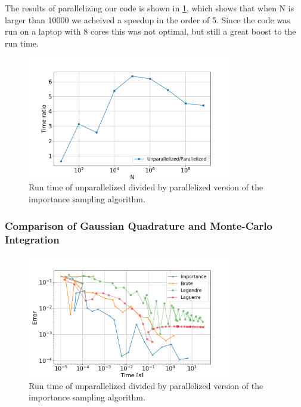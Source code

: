 The results of parallelizing our code is shown in \cref{fig:mc_time_ratio}, which
shows that when N is larger than 10000 we acheived a speedup in the order of 5.
Since the code was run on a laptop with 8 cores this was not optimal, but still
a great boost to the run time.

\begin{figure}[H]
  \centering
  \includegraphics[width=0.8\textwidth]{../figures/mc_time_ratio.png}
  \caption{Run time of unparallelized divided by parallelized version
          of the importance sampling algorithm.}

  \label{fig:mc_time_ratio}
\end{figure}


\subsubsection{Comparison of Gaussian Quadrature and Monte-Carlo Integration}

\begin{figure}[H]
  \centering
  \includegraphics[width=0.8\textwidth]{../figures/time_compare.png}
  \caption{Run time of unparallelized divided by parallelized version
          of the importance sampling algorithm.}

  \label{fig:time_compare}
\end{figure}
